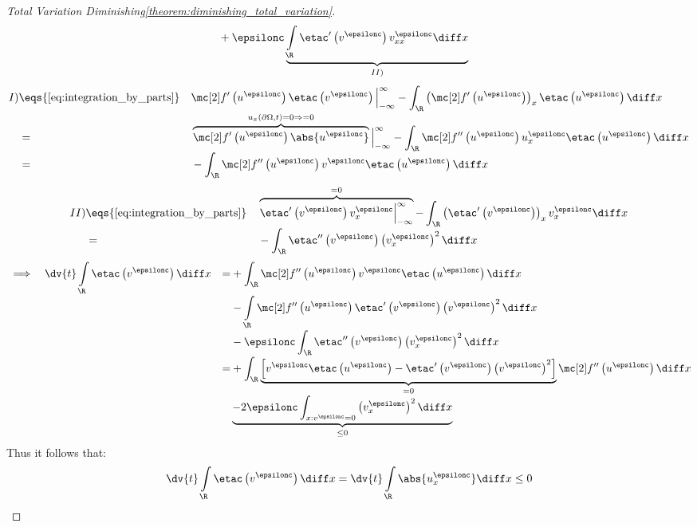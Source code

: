 \begin{proofbox}
\begin{proof}[Total Variation Diminishing\cref{theorem:diminishing_total_variation}]
\begin{align*}
            &+\epsilonc\underbrace{\int\limits_{\R}\etac'\left(v^{\epsilonc}\right)v_{xx}^{\epsilonc}\diff x}_{II)}
        \end{align*}
        \begin{alignat*}{3}
            I)&\eqs{\cref{eq:integration_by_parts}}&&\flux' \left(u^{\epsilonc}\right)\etac \left(v^{\epsilonc}\right)\Big|_{-\infty}^{\infty}
            -\int_{\R}\left(\flux'\left(u^{\epsilonc}\right)\right)_{x}\etac\left(u^{\epsilonc}\right)\diff x \\[-1\jot]
        &=&&\overbrace{\flux' \left(u^{\epsilonc}\right)\abs{u^{\epsilonc}}}^{u_{x}(\partial\Omega, t)=0\Rightarrow=0}\Big|_{-\infty}^{\infty}
            -\int_{\R}\flux''\left(u^{\epsilonc}\right)u_{x}^{\epsilonc}\etac\left(u^{\epsilonc}\right)\diff x \\[-1\jot]
        &=&&-\int_{\R}\flux''\left(u^{\epsilonc}\right)v^{\epsilonc}\etac\left(u^{\epsilonc}\right)\diff x
        \end{alignat*}
        \begin{alignat*}{3}
            II)&\eqs{\cref{eq:integration_by_parts}}&&\overbrace{\etac'\left(v^{\epsilonc}\right)v_{x}^{\epsilonc}\Big|_{-\infty}^{\infty}}^{=0}
            -\int_{\R}\left(\etac'\left(v^{\epsilonc}\right)\right)_{x}v_{x}^{\epsilonc}\diff x \\[-1\jot]
        &=&&-\int_{\R}\etac''\left(v^{\epsilonc}\right)\left(v_{x}^{\epsilonc}\right)^{2}\diff x
        \end{alignat*}
        \begin{alignat*}{5}
            &\implies&&
          \dv{t}\int\limits_{\R}\etac\left(v^{\epsilonc}\right)\diff x&=&
            +\int_{\R}\flux''\left(u^{\epsilonc}\right)v^{\epsilonc}\etac\left(u^{\epsilonc}\right)\diff x \\[-1\jot]
            &&&&&-\int\limits_{\R}\flux''\left(u^{\epsilonc}\right)\etac'\left(v^{\epsilonc}\right)\left(v^{\epsilonc}\right)^{2}\diff x\\[-1\jot]
            &&&&&-\epsilonc\int_{\R}\etac''\left(v^{\epsilonc}\right)\left(v_{x}^{\epsilonc}\right)^{2}\diff x \\[-1\jot]
            &&&&=&+\int_{\R}\underbrace{\left[v^{\epsilonc}\etac\left(u^{\epsilonc}\right)-\etac'\left(v^{\epsilonc}\right)\left(v^{\epsilonc}\right)^{2}\right]}_{=0}\flux''\left(u^{\epsilonc}\right)\diff x \\[-1\jot]
            &&&&&\underbrace{-2\epsilonc\int_{x:v^{\epsilonc}=0}\left(v_{x}^{\epsilonc}\right)^{2}\diff x}_{\leq 0}
        \end{alignat*}
        Thus it follows that:
        \begin{align*}
            \dv{t}\int\limits_{\R}\etac\left(v^{\epsilonc}\right)\diff x=\dv{t}\int\limits_{\R}\abs{u_{x}^{\epsilonc}}\diff x\leq0
        \end{align*}
    \end{proof}
\end{proofbox}

